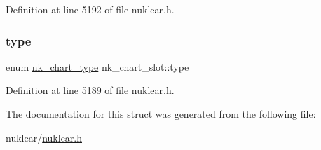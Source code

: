 Definition at line 5192 of file nuklear.\+h.

\mbox{\label{structnk__chart__slot_a5ddac2544ff93ee695d262fb11274c27}} 
\subsubsection{\texorpdfstring{type}{type}}
{\footnotesize\ttfamily enum \mbox{\hyperlink{nuklear_8h_a2685f2dbd5f80f76cbaebd524a12b7ef}{nk\+\_\+chart\+\_\+type}} nk\+\_\+chart\+\_\+slot\+::type}



Definition at line 5189 of file nuklear.\+h.



The documentation for this struct was generated from the following file\+:\begin{DoxyCompactItemize}
\item 
nuklear/\mbox{\hyperlink{nuklear_8h}{nuklear.\+h}}\end{DoxyCompactItemize}
